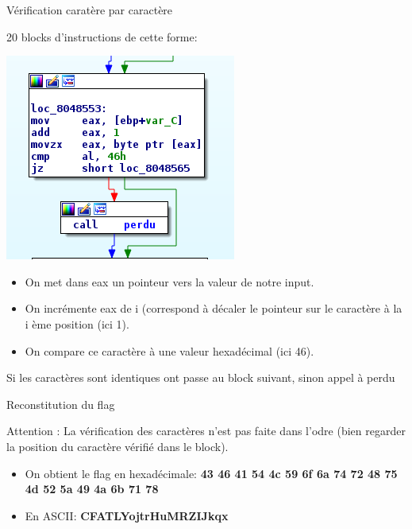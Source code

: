 \documentclass[10pt,sans,usenames,dvipsnames,french,compress]{beamer}
\begin{document}
\begin{frame}[fragile]{Vérification caratère par caractère}
	\begin{block}{}
		20 blocks d'instructions de cette forme:    
 		
 		\begin{center}
			\includegraphics[height=0.2\linewidth]{114/cmpcara.png}
		\end{center}
	\end{block}

	\begin{block}{}
		\begin{itemize}
			\item On met dans eax un pointeur vers la valeur de notre input.
			\item On incrémente eax de i (correspond à décaler le pointeur sur le caractère à la i ème position (ici 1).
			\item On compare ce caractère à une valeur hexadécimal (ici 46).
		\end{itemize}
	\end{block}

	\begin{block}{}
		Si les caractères sont identiques ont passe au block suivant, sinon appel à perdu
	\end{block}
\end{frame}
		
\begin{frame}[fragile]{Reconstitution du flag}
	\begin{block}{Attention :}
		La vérification des caractères n'est pas faite dans l'odre (bien regarder la position du caractère vérifié dans le block).
	\end{block}

	\begin{exampleblock}{}
		\begin{itemize}
			\item On obtient le flag en hexadécimale: \textbf{43 46 41 54 4c 59 6f 6a 74 72 48 75 4d 52 5a 49 4a 6b 71 78}
			\item En ASCII: \textbf{CFATLYojtrHuMRZIJkqx}
		\end{itemize}
	\end{exampleblock}
\end{frame}
\end{document}
